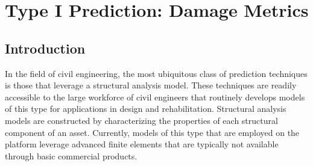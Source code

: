 

\chapter{Type I Prediction: Damage Metrics}\label{ch:predictor_t1}

\section{Introduction}


\noindent
In the field of civil engineering, the most ubiquitous class of prediction techniques is those that leverage a structural analysis model.
These techniques are readily
accessible to the large workforce of civil engineers that routinely develops models of
this type for applications in design and rehabilitation.
Structural analysis models are constructed by characterizing the properties of each structural component of an asset. 
Currently,  models of this type that are employed on the \BRACE{} platform leverage advanced finite elements that are typically not available through basic commercial products. 

